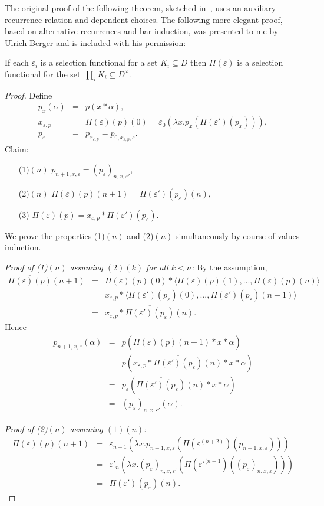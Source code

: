 \documentclass{LMCS}
\newcommand{\e}{\varepsilon}
\newcommand{\D}{D}
\begin{document}
The original proof of the following theorem, sketched
in~\cite{escardo:lics07}, uses an auxiliary recurrence relation and
dependent choices. The following more elegant proof, based on
alternative recurrences and bar induction, was presented to me by
Ulrich Berger and is included with his permission:
\begin{thm} \label{searchable:tychonoff} If each $\e_i$
  is a selection functional for a set $K_i \subseteq \D$ then
  $\Pi(\e)$ is a selection functional for the set~$\prod_i
  K_i \subseteq D^\omega$.
\end{thm}
\begin{proof}
Define
\begin{eqnarray*}
p_x(\alpha) & = & p(x * \alpha), \\
x_{\e,p} & = & \Pi(\e)(p)(0) = \e_0(\lambda x.p_x(\Pi(\e')(p_x))), \\
p_\e & = & p_{x_{\e,p}} = p_{0,x_{\e,p},\e}.
\end{eqnarray*}
Claim:
\begin{enumerate}
\item[(1)$(n)$] \quad $p_{n+1,x,\e}  = (p_\e)_{n,x,\e'}$,
\item[(2)$(n)$] \quad $\Pi(\e)(p)(n+1) = \Pi(\e')(p_\e)(n)$,
\item[(3)\phantom{$(n)$}] \quad $\Pi(\e)(p) = x_{\e,p} * \Pi(\e')(p_\e)$.
\end{enumerate}
We prove the properties (1)$(n)$ and (2)$(n)$ simultaneously by course
of values induction.

\noindent
\emph{Proof of (1)$(n)$ assuming $(2)(k)$ for all $k<n$:} 
By the assumption,
\begin{eqnarray*}
\overline{\Pi(\e)(p)}(n+1) 
& = & \Pi(\e)(p)(0) * \langle\Pi(\e)(p)(1), ... , \Pi(\e)(p)(n)\rangle \\
& = & x_{\e,p} * \langle\Pi(\e')(p_\e)(0), ... , \Pi(\e')(p_\e)(n-1)\rangle \\
& = &  x_{\e,p} * \overline{\Pi(\e')(p_\e)}(n).
\end{eqnarray*}
Hence
\begin{eqnarray*}
p_{n+1,x,\e}(\alpha) 
& = & p(\overline{\Pi(\e)(p)}(n+1) * x * \alpha) \\
& = & p(x_{\e,p} * \overline{\Pi(\e')(p_\e)}(n) * x * \alpha) \\
& = & p_\e(\overline{\Pi(\e')(p_\e)}(n) * x * \alpha)\\
& = & (p_\e)_{n,x,\e'}(\alpha).
\end{eqnarray*}

\noindent
\emph{Proof of (2)$(n)$ assuming $(1)(n)$:}
 \begin{eqnarray*}
\Pi(\e)(p)(n+1) 
& = & \e_{n+1}(\lambda x.p_{n+1,x,\e}(\Pi(\e^{(n+2)})(p_{n+1,x,\e}))) \\
& = & \e'_n (\lambda x.(p_\e)_{n,x,\e'}(\Pi(\e'^{(n+1})((p_\e)_{n,x,\e})))  \\
& = & \Pi(\e')(p_\e)(n).
\end{eqnarray*}


\end{proof}
\end{document}
